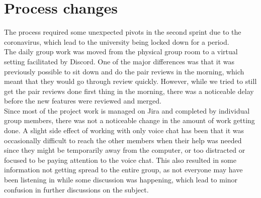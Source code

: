\section{Process changes}
The process required some unexpected pivots in the second sprint due to the coronavirus, which lead to the university being locked down for a period.
\\
The daily group work was moved from the physical group room to a virtual setting facilitated by Discord.
One of the major differences was that it was previously possible to sit down and do the pair reviews in the morning, which meant that they would go through review quickly.
However, while we tried to still get the pair reviews done first thing in the morning, there was a noticeable delay before the new features were reviewed and merged.\\

Since most of the project work is managed on Jira and completed by individual group members, there was not a noticeable change in the amount of work getting done.
A slight side effect of working with only voice chat has been that it was occasionally difficult to reach the other members when their help was needed since they might be temporarily away from the computer, or too distracted or focused to be paying attention to the voice chat.
This also resulted in some information not getting spread to the entire group, as not everyone may have been listening in while some discussion was happening, which lead to minor confusion in further discussions on the subject.